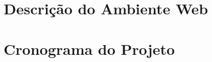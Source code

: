 % 

\section{Descrição do Ambiente Web} %
\label{sec:introdu_o}
 

\section{Cronograma do Projeto} %
\label{sec:produtos}
 
